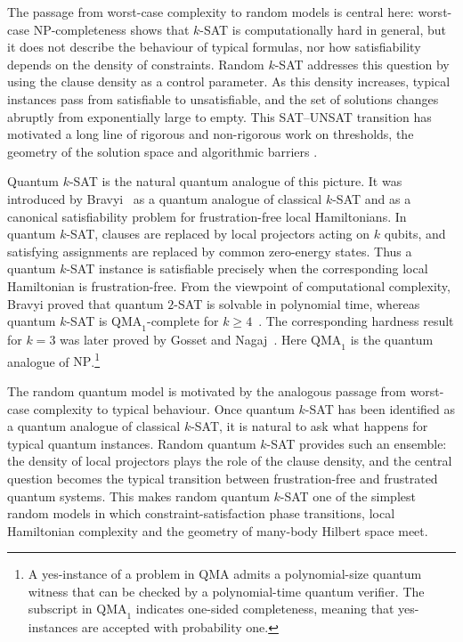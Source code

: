 \documentclass[11pt]{article}
\begin{document}
The passage from worst-case
complexity to random models is central here: worst-case
\(\mathrm{NP}\)-completeness shows that \(k\)-SAT is computationally hard in
general, but it does not describe the behaviour of typical formulas, nor how
satisfiability depends on the density of constraints.  Random \(k\)-SAT
addresses this question by using the clause density as a control parameter.
As this density increases, typical instances pass from satisfiable to
unsatisfiable, and the set of solutions changes abruptly from exponentially
large to empty.  This SAT--UNSAT transition has motivated a long line of
rigorous and non-rigorous work on thresholds, the geometry of the solution
space and algorithmic barriers
\cite{MezardMontanari09,Friedgut99,AchlioptasPeres04,DingSlySun22,AchlioptasMoore06,MezardParisiZecchina02,MertensMezardZecchina06, KrzakalaMontanariRicciSemerjianZdeborova07,AchlioptasCojaOghlan08,KirkpatrickSelman94,MonassonZecchina99}.

Quantum \(k\)-SAT is the natural quantum analogue of this picture.  It was
introduced by Bravyi~\cite{Bravyi06} as a quantum analogue of classical
\(k\)-SAT and as a canonical satisfiability problem for frustration-free local
Hamiltonians.  In quantum \(k\)-SAT, clauses are replaced by local projectors
acting on \(k\) qubits, and satisfying assignments are replaced by common
zero-energy states.  Thus a quantum \(k\)-SAT instance is satisfiable precisely
when the corresponding local Hamiltonian is frustration-free.  From the
viewpoint of computational complexity, Bravyi proved that quantum \(2\)-SAT is
solvable in polynomial time, whereas quantum \(k\)-SAT is
\(\mathrm{QMA}_1\)-complete for \(k\geq 4\)~\cite{Bravyi06}.  The corresponding
hardness result for \(k=3\) was later proved by Gosset and
Nagaj~\cite{GossetNagaj16}.  Here \(\mathrm{QMA}_1\) is the quantum analogue of
\(\mathrm{NP}\).\footnote{A yes-instance of a problem in \(\mathrm{QMA}\)
	admits a polynomial-size quantum witness that can be checked by a
	polynomial-time quantum verifier.  The subscript in \(\mathrm{QMA}_1\)
	indicates one-sided completeness, meaning that yes-instances are accepted with
	probability one.}

The random quantum model is motivated by the analogous passage from worst-case
complexity to typical behaviour.  Once quantum \(k\)-SAT has been identified
as a quantum analogue of classical \(k\)-SAT, it is natural to ask what happens
for typical quantum instances.  Random quantum \(k\)-SAT provides such an
ensemble: the density of local projectors plays the role of the clause
density, and the central question becomes the typical transition between
frustration-free and frustrated quantum systems.  This makes random quantum
\(k\)-SAT one of the simplest random models in which constraint-satisfaction
phase transitions, local Hamiltonian complexity and the geometry of many-body
Hilbert space meet.
\end{document}

